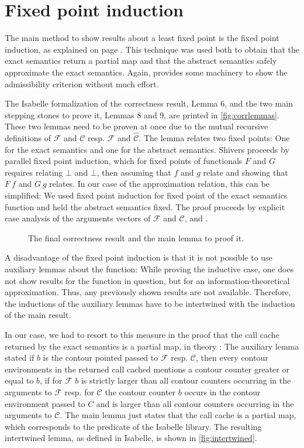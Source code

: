\documentclass[a4paper,halfparskip,DIV=10,11pt]{scrbook}
\newcommand{\C}{\mathcal C}
\newcommand{\F}{\mathcal F}
\newcommand{\aC}{\widehat{\mathcal C}}
\newcommand{\aF}{\widehat{\mathcal F}}
\begin{document}
\section{Fixed point induction}

The main method to show results about a least fixed point is the fixed point induction, as explained on page \pageref{fixedpointinduction}. This technique was used both to obtain that the exact semantics return a partial map and that the abstract semantics safely approximate the exact semantics. Again,  provides some machinery to show the admissibility criterion without much effort.

The Isabelle formalization of the correctness result, Lemma 6, and the two main stepping stones to prove it, Lemmas 8 and 9, are printed in \vref{fig:corrlemmas}. These two lemmas need to be proven at once due to the mutual recursive definitions of $\F$ and $\C$ resp. $\aF$ and $\aC$. The lemma relates two fixed points: One for the exact semantics and one for the abstract semantics. Shivers proceeds by parallel fixed point induction, which for fixed points of functionals  $F$ and $G$ requires relating $\bot$ and $\bot$, then assuming that $f$ and $g$ relate and showing that $F\ f$ and $G\ g$ relates. In our case of the approximation relation, this can be simplified: We used fixed point induction for fixed point of the exact semantics function and held the abstract semantics fixed. The proof proceeds by explicit case analysis of the arguments vectors of $\F$ and $\C$,  and .

\begin{figure}
\begin{framed}

\end{framed}
\caption{The final correctness result and the main lemma to proof it.}
\label{fig:corrlemmas}
\end{figure}

A disadvantage of the fixed point induction is that it is not possible to use auxiliary lemmas about the function: While proving the inductive case, one does not show results for the function in question, but for an information-theoretical approximation. Thus, any previously shown results are not available. Therefore, the inductions of the auxiliary lemmas have to be intertwined with the induction of the main result.

In our case, we had to resort to this measure in the proof that the call cache returned by the exact semantics is a partial map, in theory : The auxiliary lemma stated if $b$ is the contour pointed passed to $\F$ resp. $\C$, then every contour environments in the returned call cached mentions a contour counter greater or equal to $b$, if for $\F$ $b$ is strictly larger than all contour counters occurring in the arguments to $\F$ resp. for $\C$ the contour counter $b$ occurs in the contour environment passed to $C$ and is larger than all contour counters occurring in the arguments to $\C$. The main lemma just states that the call cache is a partial map, which corresponds to the predicate  of the Isabelle library. The resulting intertwined lemma, as defined in Isabelle, is shown in \vref{fig:intertwined}.
\end{document}
